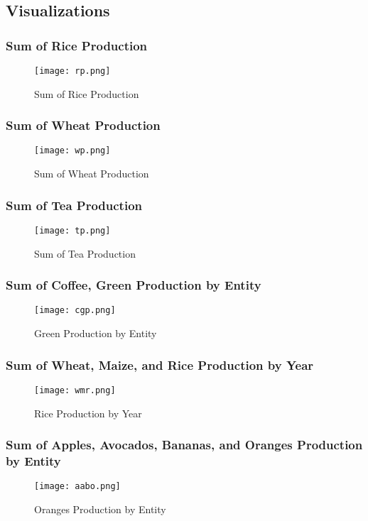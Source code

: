 \documentclass{article}
\begin{document}
\subsection{Visualizations}
\subsubsection{Sum of Rice Production}
\begin{figure}[H]
    \centering
    \texttt{[image: rp.png]}
    \caption{Sum of Rice Production}
    \label{fig:rp}
  \end{figure}
\subsubsection{Sum of Wheat Production}
\begin{figure}[H]
    \centering
    \texttt{[image: wp.png]}
    \caption{Sum of Wheat Production}
    \label{fig:wp}
  \end{figure}
\subsubsection{Sum of Tea Production}
\begin{figure}[H]
    \centering
    \texttt{[image: tp.png]}
    \caption{Sum of Tea Production}
    \label{fig:tp}
  \end{figure}
\subsubsection{Sum of Coffee, Green Production by Entity}
\begin{figure}[H]
    \centering
    \texttt{[image: cgp.png]}
    \caption{Green Production by Entity}
    \label{fig:cgp}
  \end{figure}
\subsubsection{Sum of Wheat, Maize, and Rice Production by Year}
\begin{figure}[H]
    \centering
    \texttt{[image: wmr.png]}
    \caption{Rice Production by Year}
    \label{fig:wmr}
  \end{figure}
\subsubsection{Sum of  Apples, Avocados, Bananas, and Oranges Production by Entity}
\begin{figure}[H]
    \centering
    \texttt{[image: aabo.png]}
    \caption{Oranges Production by Entity}
    \label{fig:aabo}
  \end{figure}
\end{document}
